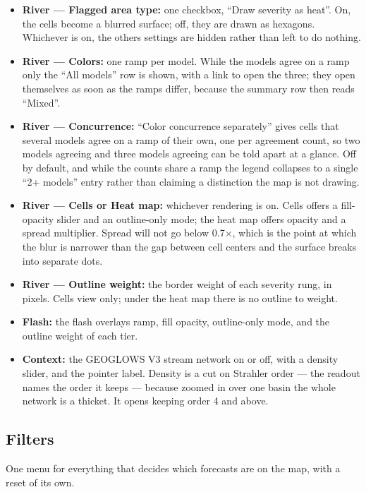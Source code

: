 \begin{itemize}
\item
  \textbf{River --- Flagged area type:} one checkbox, ``Draw severity as heat''. On, the cells become a blurred surface; off, they are drawn as hexagons. Whichever is on, the other\textquotesingle s settings are hidden rather than left to do nothing.
\item
  \textbf{River --- Colors:} one ramp per model. While the models agree on a ramp only the ``All models'' row is shown, with a link to open the three; they open themselves as soon as the ramps differ, because the summary row then reads ``Mixed''.
\item
  \textbf{River --- Concurrence:} ``Color concurrence separately'' gives cells that several models agree on a ramp of their own, one per agreement count, so two models agreeing and three models agreeing can be told apart at a glance. Off by default, and while the counts share a ramp the legend collapses to a single ``2+ models'' entry rather than claiming a distinction the map is not drawing.
\item
  \textbf{River --- Cells or Heat map:} whichever rendering is on. Cells offers a fill-opacity slider and an outline-only mode; the heat map offers opacity and a spread multiplier. Spread will not go below 0.7×, which is the point at which the blur is narrower than the gap between cell centers and the surface breaks into separate dots.
\item
  \textbf{River --- Outline weight:} the border weight of each severity rung, in pixels. Cells view only; under the heat map there is no outline to weight.
\item
  \textbf{Flash:} the flash overlay\textquotesingle s ramp, fill opacity, outline-only mode, and the outline weight of each tier.
\item
  \textbf{Context:} the GEOGLOWS V3 stream network on or off, with a density slider, and the pointer label. Density is a cut on Strahler order --- the readout names the order it keeps --- because zoomed in over one basin the whole network is a thicket. It opens keeping order 4 and above.
\end{itemize}

\subsection{Filters}\label{filters}

One menu for everything that decides which forecasts are on the map, with a reset of its own.

